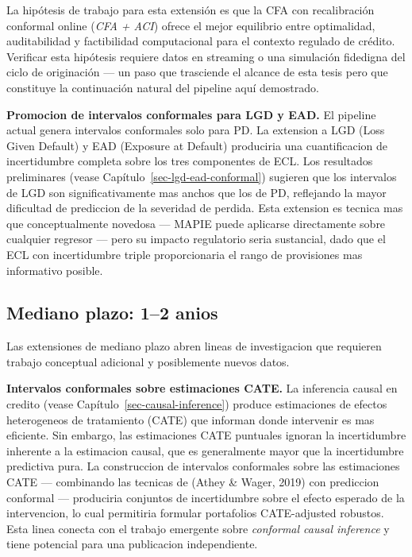 \documentclass[
  spanish,
  11pt,
  letterpaper,
]{scrbook}
\theoremstyle{plain}
\theoremstyle{remark}
\begin{document}
La hipótesis de trabajo para esta extensión es que la CFA con
recalibración conformal online (\emph{CFA + ACI}) ofrece el mejor
equilibrio entre optimalidad, auditabilidad y factibilidad computacional
para el contexto regulado de crédito. Verificar esta hipótesis requiere
datos en streaming o una simulación fidedigna del ciclo de originación
--- un paso que trasciende el alcance de esta tesis pero que constituye
la continuación natural del pipeline aquí demostrado.

\textbf{Promocion de intervalos conformales para LGD y EAD.} El pipeline
actual genera intervalos conformales solo para PD. La extension a LGD
(Loss Given Default) y EAD (Exposure at Default) produciria una
cuantificacion de incertidumbre completa sobre los tres componentes de
ECL. Los resultados preliminares (vease
Capítulo~\ref{sec-lgd-ead-conformal}) sugieren que los intervalos de LGD
son significativamente mas anchos que los de PD, reflejando la mayor
dificultad de prediccion de la severidad de perdida. Esta extension es
tecnica mas que conceptualmente novedosa --- MAPIE puede aplicarse
directamente sobre cualquier regresor --- pero su impacto regulatorio
seria sustancial, dado que el ECL con incertidumbre triple
proporcionaria el rango de provisiones mas informativo posible.

\subsection{Mediano plazo: 1--2 anios}\label{sec-future-medium}

Las extensiones de mediano plazo abren lineas de investigacion que
requieren trabajo conceptual adicional y posiblemente nuevos datos.

\textbf{Intervalos conformales sobre estimaciones CATE.} La inferencia
causal en credito (vease Capítulo~\ref{sec-causal-inference}) produce
estimaciones de efectos heterogeneos de tratamiento (CATE) que informan
donde intervenir es mas eficiente. Sin embargo, las estimaciones CATE
puntuales ignoran la incertidumbre inherente a la estimacion causal, que
es generalmente mayor que la incertidumbre predictiva pura. La
construccion de intervalos conformales sobre las estimaciones CATE ---
combinando las tecnicas de (Athey \& Wager, 2019) con prediccion
conformal --- produciria conjuntos de incertidumbre sobre el efecto
esperado de la intervencion, lo cual permitiria formular portafolios
CATE-adjusted robustos. Esta linea conecta con el trabajo emergente
sobre \emph{conformal causal inference} y tiene potencial para una
publicacion independiente.
\end{document}
